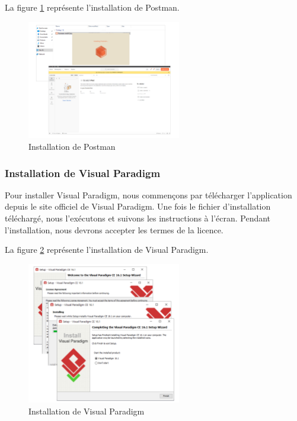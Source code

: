 \documentclass[12pt]{report}
\begin{document}
			La figure \ref{fig:postman} représente l’installation de Postman.
			
			\begin{figure}[h]
				\centering
				\includegraphics[width=0.6\textwidth]{postman.png}
				\caption{Installation de Postman}
				\label{fig:postman}
			\end{figure}
			\FloatBarrier
			
			\subsubsection{Installation de Visual Paradigm}

			\hspace{15pt} Pour installer Visual Paradigm, nous commençons par télécharger l'application depuis le site officiel de Visual Paradigm. Une fois le fichier d'installation téléchargé, nous l'exécutons et suivons les instructions à l'écran. Pendant l'installation, nous devrons accepter les termes de la licence.

			La figure \ref{fig:vispar} représente l’installation de Visual Paradigm.
			
			\begin{figure}[h]
				\centering
				\includegraphics[width=0.6\textwidth]{vispar.png}
				\caption{Installation de Visual Paradigm}
				\label{fig:vispar}
			\end{figure}
			\FloatBarrier
\end{document}
